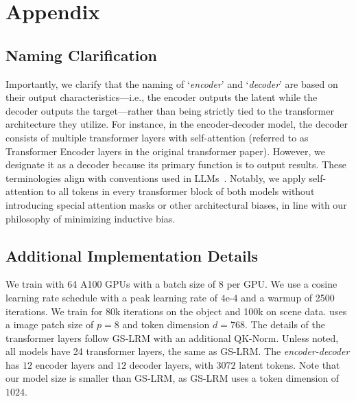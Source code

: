 \section{Appendix}
\subsection{Naming Clarification}
\label{appendix:naming_clarification}
Importantly, we clarify that the naming of ‘\textit{encoder}' and `\textit{decoder}' are based on their output characteristics---i.e., the encoder outputs the latent while the decoder outputs the target---rather than being strictly tied to the transformer architecture they utilize. 
For instance, in the encoder-decoder model, the decoder consists of multiple transformer layers with self-attention (referred to as Transformer Encoder layers in the original transformer paper). However, we designate it as a decoder because its primary function is to output results.
These terminologies align with conventions used in LLMs~\citep{vaswani2017transformer, radford2019language, devlin2018bert}.
Notably, we apply self-attention to all tokens in every transformer block of both models without introducing special attention masks or other architectural biases, in line with our philosophy of minimizing inductive bias.

\subsection{Additional Implementation Details}
\label{appendix:more_details}
We train \paperName{} with 64 A100 GPUs with a batch size of 8 per GPU. We use a cosine learning rate schedule with a peak learning rate of $4\text{e-}4$ and a warmup of 2500 iterations. We train \paperName{} for 80k iterations on the object and 100k on scene data. \paperName{} uses a image patch size of $p=8$ and token dimension $d=768$. The details of the transformer layers follow GS-LRM\citep{zhang2024gslrmlargereconstructionmodel} with an additional QK-Norm. 
Unless noted, all models have 24 transformer layers, the same as GS-LRM. The \textit{encoder-decoder} \paperName{} has $12$ encoder layers and $12$ decoder layers, with $3072$ latent tokens. Note that our model size is smaller than GS-LRM, as GS-LRM uses a token dimension of $1024$.

